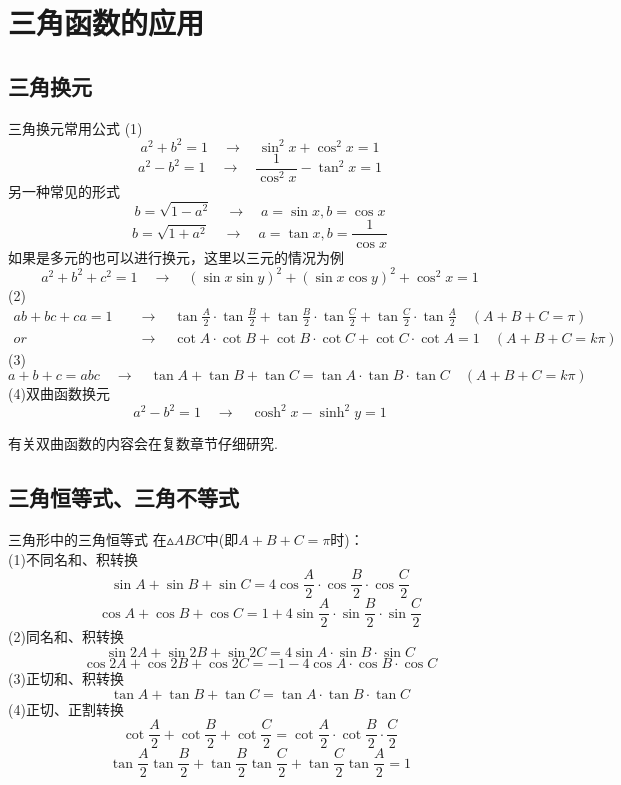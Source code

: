 \documentclass[lang=cn, zihao=4.5]{elegantbook}
\begin{document}
\section{三角函数的应用}

\subsection{三角换元}

\begin{proposition}{三角换元常用公式}
    (1)
    $$a^2+b^2=1 \quad \longrightarrow \quad \sin^2{x}+\cos^2{x}=1$$
    $$a^2-b^2=1 \quad \longrightarrow \quad \frac{1}{\cos^2 x}-\tan^2 {x}=1$$
    另一种常见的形式
    $$b=\sqrt{1-a^2} \quad \longrightarrow \quad a=\sin{x} , b=\cos{x}$$
    $$b=\sqrt{1+a^2} \quad \longrightarrow \quad a=\tan{x} , b=\frac{1}{\cos{x}}$$
    如果是多元的也可以进行换元，这里以三元的情况为例
    $$a^2+b^2+c^2=1 \quad \longrightarrow \quad (\sin{x}\sin{y})^2+(\sin{x}\cos{y})^2+\cos^2{x}=1$$
    (2)
    \begin{align*}
        ab+bc+ca=1 \quad & \longrightarrow \quad \tan{\frac{A}{2}} \cdot \tan{\frac{B}{2}} + \tan{\frac{B}{2}} \cdot \tan{\frac{C}{2}} + \tan{\frac{C}{2}} \cdot \tan{\frac{A}{2}} \quad (A+B+C=\pi) \\
        or & \longrightarrow \quad \cot{A} \cdot \cot{B} + \cot{B} \cdot \cot{C} + \cot{C} \cdot \cot{A} = 1 \quad (A+B+C=k\pi)
    \end{align*}
    (3)$$a+b+c=abc \quad \longrightarrow \quad \tan{A}+\tan{B}+\tan{C}=\tan{A} \cdot \tan{B} \cdot \tan{C} \quad (A+B+C=k\pi)$$
    (4)双曲函数换元
    $$a^2-b^2=1 \quad \longrightarrow \quad \cosh^2{x}-\sinh^2{y}=1$$
\end{proposition}
\begin{remark}
	有关双曲函数的内容会在复数章节仔细研究.
\end{remark}

\subsection{三角恒等式、三角不等式}

\begin{proposition}{三角形中的三角恒等式} %
    在$\vartriangle ABC$中(即$A+B+C=\pi$时)：\\
    (1)不同名和、积转换
    $$\sin A + \sin B + \sin C = 4 \cos \frac{A}{2} \cdot \cos \frac{B}{2} \cdot \cos \frac{C}{2}$$
    $$\cos A + \cos B + \cos C = 1 + 4 \sin \frac{A}{2} \cdot \sin \frac{B}{2} \cdot \sin \frac{C}{2}$$
    (2)同名和、积转换
    $$\sin 2A + \sin 2B + \sin 2C = 4\sin A \cdot \sin B \cdot \sin C$$
    $$\cos 2A + \cos 2B + \cos 2C = -1 - 4\cos A \cdot \cos B \cdot \cos C$$
    (3)正切和、积转换
    $$\tan A + \tan B + \tan C = \tan A \cdot \tan B \cdot \tan C$$
    (4)正切、正割转换
    $$\cot \frac{A}{2} + \cot \frac{B}{2} + \cot \frac{C}{2} = \cot \frac{A}{2} \cdot \cot \frac{B}{2} \cdot \frac{C}{2}$$
    $$\tan \frac{A}{2} \tan \frac{B}{2} + \tan \frac{B}{2} \tan \frac{C}{2} + \tan \frac{C}{2} \tan \frac{A}{2} = 1$$
\end{proposition}
\end{document}
